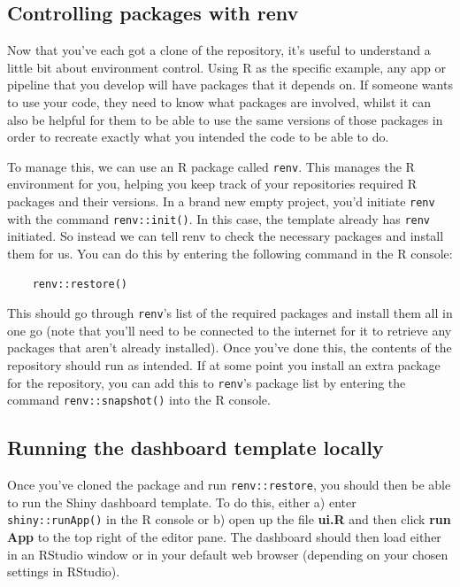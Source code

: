 \documentclass[
  12pt,
]{article}
\begin{document}
\hypertarget{controlling-packages-with-renv}{%
\subsection{Controlling packages with
renv}\label{controlling-packages-with-renv}}

Now that you've each got a clone of the repository, it's useful to
understand a little bit about environment control. Using R as the
specific example, any app or pipeline that you develop will have
packages that it depends on. If someone wants to use your code, they
need to know what packages are involved, whilst it can also be helpful
for them to be able to use the same versions of those packages in order
to recreate exactly what you intended the code to be able to do.

To manage this, we can use an R package called \texttt{renv}. This
manages the R environment for you, helping you keep track of your
repositories required R packages and their versions. In a brand new
empty project, you'd initiate \texttt{renv} with the command
\texttt{renv::init()}. In this case, the template already has
\texttt{renv} initiated. So instead we can tell renv to check the
necessary packages and install them for us. You can do this by entering
the following command in the R console:

\begin{verbatim}
    renv::restore()
\end{verbatim}

This should go through \texttt{renv}'s list of the required packages and
install them all in one go (note that you'll need to be connected to the
internet for it to retrieve any packages that aren't already installed).
Once you've done this, the contents of the repository should run as
intended. If at some point you install an extra package for the
repository, you can add this to \texttt{renv}'s package list by entering
the command \texttt{renv::snapshot()} into the R console.

\hypertarget{running-the-dashboard-template-locally}{%
\subsection{Running the dashboard template
locally}\label{running-the-dashboard-template-locally}}

Once you've cloned the package and run \texttt{renv::restore}, you
should then be able to run the Shiny dashboard template. To do this,
either a) enter \texttt{shiny::runApp()} in the R console or b) open up
the file \textbf{ui.R} and then click \textbf{run App} to the top right
of the editor pane. The dashboard should then load either in an RStudio
window or in your default web browser (depending on your chosen settings
in RStudio).
\end{document}
